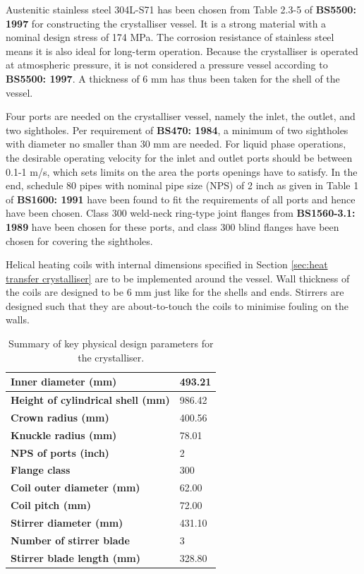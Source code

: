 Austenitic stainless steel 304L-S71 has been chosen from Table 2.3-5 of \textbf{BS5500: 1997} for constructing the crystalliser vessel. It is a strong material with a nominal design stress of 174 MPa. The corrosion resistance of stainless steel means it is also ideal for long-term operation. Because the crystalliser is operated at atmospheric pressure, it is not considered a pressure vessel according to \textbf{BS5500: 1997}. A thickness of 6 mm has thus been taken for the shell of the vessel.

Four ports are needed on the crystalliser vessel, namely the inlet, the outlet, and two sightholes. Per requirement of \textbf{BS470: 1984}, a minimum of two sightholes with diameter no smaller than 30 mm are needed. For liquid phase operations, the desirable operating velocity for the inlet and outlet ports should be between 0.1-1 m/s, which sets limits on the area the ports openings have to satisfy. In the end, schedule 80 pipes with nominal pipe size (NPS) of 2 inch as given in Table 1 of \textbf{BS1600: 1991} have been found to fit the requirements of all ports and hence have been chosen. Class 300 weld-neck ring-type joint flanges from \textbf{BS1560-3.1: 1989} have been chosen for these ports, and class 300 blind flanges have been chosen for covering the sightholes. 

Helical heating coils with internal dimensions specified in Section \ref{sec:heat transfer crystalliser} are to be implemented around the vessel. Wall thickness of the coils are designed to be 6 mm just like for the shells and ends. Stirrers are designed such that they are about-to-touch the coils to minimise fouling on the walls. 



\begin{table}[h] \label{tab:crystalliser mech design summary}
\centering
\caption{Summary of key physical design parameters for the crystalliser.}
\begin{tabular}{@{}l|l@{}}
\toprule
\textbf{Inner diameter (mm)}                &    493.21 \\ \midrule
\textbf{Height of cylindrical shell (mm)}   & 986.42 \\ \midrule
\textbf{Crown radius (mm)}                  & 400.56 \\ \midrule
\textbf{Knuckle radius (mm)}                & 78.01 \\ \midrule
\textbf{NPS of ports (inch)}                & 2 \\ \midrule
\textbf{Flange class}                       & 300 \\ \midrule
\textbf{Coil outer diameter (mm)}           & 62.00 \\ \midrule
\textbf{Coil pitch (mm)}                    & 72.00 \\ \midrule
\textbf{Stirrer diameter (mm)}              & 431.10 \\ \midrule
\textbf{Number of stirrer blade}            & 3 \\ \midrule
\textbf{Stirrer blade length (mm)}          & 328.80 \\ \bottomrule
\end{tabular}
\end{table}

